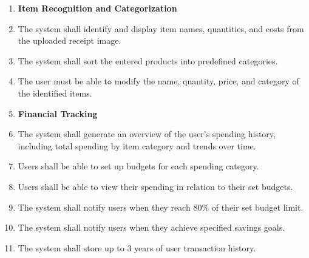 \documentclass[12pt]{article}
\begin{document}
\begin{enumerate}[label=FR\arabic*]
  \item[] \textbf{Item Recognition and Categorization}
  \item The system shall identify and display item names, quantities, and costs
  from the uploaded receipt image.
  \item The system shall sort the entered products into predefined categories.
  \item The user must be able to modify the name, quantity, price, and category
  of the identified items.   

  \item[] \textbf{Financial Tracking}
  \item The system shall generate an overview of the user's spending history,
  including total spending by item category and trends over time.
  \item Users shall be able to set up budgets for each spending category.
  \item Users shall be able to view their spending in relation to their set
  budgets.
  \item The system shall notify users when they reach 80\% of their set budget
  limit.
  \item The system shall notify users when they achieve specified savings goals.
  \item The system shall store up to 3 years of user transaction history.
\end{enumerate}

\newpage
\end{document}
